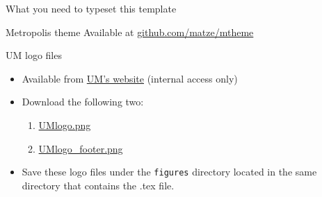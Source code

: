 \documentclass[12pt]{beamer}
\begin{document}
\begin{frame}{{\color{UMYellow} What you need} to typeset this template}

\begin{exampleblock}{Metropolis theme}
Available at {\footnotesize \href{https://github.com/matze/mtheme}{github.com/matze/mtheme}}	
\end{exampleblock}

\begin{exampleblock}{UM logo files}
\begin{itemize}
\item Available from \href{https://identity.co.um.edu.mo/}{UM's website} (internal access only)
\item Download the following two: 
	\begin{enumerate}
	\item \href{linktoUM}{\footnotesize {UMlogo.png}}
	\item \href{linktoUM}{\footnotesize {UMlogo\_footer.png}}
	\end{enumerate}
\item Save these logo files under the {\tt \footnotesize figures} directory located in the same directory that contains the .tex file.
\end{itemize}
\end{exampleblock}

\end{frame}


{
}
\end{document}
